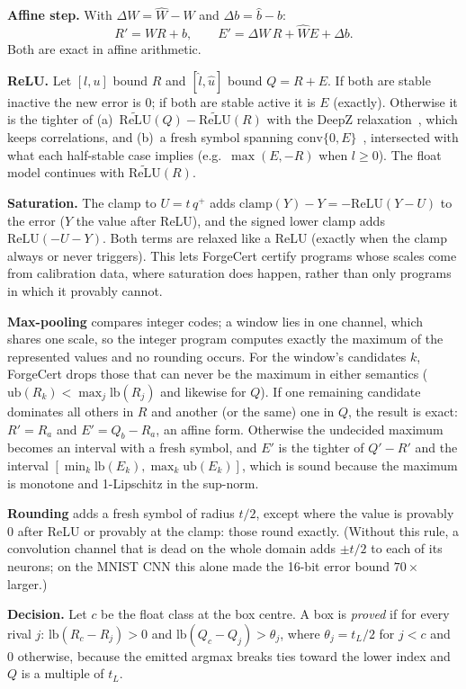 \textbf{Affine step.} With $\Delta W=\hat W-W$ and $\Delta b=\hat b-b$:
\[R'=W R+b,\qquad E'=\Delta W\,R+\hat W E+\Delta b .\]
Both are exact in affine arithmetic.

\textbf{ReLU.} Let $[l,u]$ bound $R$ and $[\hat l,\hat u]$ bound $Q=R+E$. If both are stable inactive the new error is $0$; if both are stable active it is $E$ (exactly). Otherwise it is the tighter of (a)~$\widetilde{\mathrm{ReLU}}(Q)-\widetilde{\mathrm{ReLU}}(R)$ with the DeepZ relaxation~\cite{deepz}, which keeps correlations, and (b)~a fresh symbol spanning $\mathrm{conv}\{0,E\}$~\cite{reludiff}, intersected with what each half-stable case implies (e.g.\ $\max(E,-R)$ when $l\ge0$). The float model continues with $\widetilde{\mathrm{ReLU}}(R)$.

\textbf{Saturation.} The clamp to $U=t\,q^+$ adds $\mathrm{clamp}(Y)-Y=-\mathrm{ReLU}(Y-U)$ to the error ($Y$ the value after ReLU), and the signed lower clamp adds $\mathrm{ReLU}(-U-Y)$. Both terms are relaxed like a ReLU (exactly when the clamp always or never triggers). This lets ForgeCert certify programs whose scales come from calibration data, where saturation does happen, rather than only programs in which it provably cannot.

\textbf{Max-pooling} compares integer codes; a window lies in one channel, which shares one scale, so the integer program computes exactly the maximum of the represented values and no rounding occurs. For the window's candidates $k$, ForgeCert drops those that can never be the maximum in either semantics ($\mathrm{ub}(R_k)<\max_j\mathrm{lb}(R_j)$ and likewise for $Q$). If one remaining candidate dominates all others in $R$ and another (or the same) one in $Q$, the result is exact: $R'=R_a$ and $E'=Q_b-R_a$, an affine form. Otherwise the undecided maximum becomes an interval with a fresh symbol, and $E'$ is the tighter of $Q'-R'$ and the interval $[\min_k\mathrm{lb}(E_k),\max_k\mathrm{ub}(E_k)]$, which is sound because the maximum is monotone and 1-Lipschitz in the sup-norm.

\textbf{Rounding} adds a fresh symbol of radius $t/2$, except where the value is provably $0$ after ReLU or provably at the clamp: those round exactly. (Without this rule, a convolution channel that is dead on the whole domain adds $\pm t/2$ to each of its neurons; on the MNIST CNN this alone made the 16-bit error bound $70\times$ larger.)

\textbf{Decision.} Let $c$ be the float class at the box centre. A box is \emph{proved} if for every rival $j$: $\mathrm{lb}(R_c-R_j)>0$ and $\mathrm{lb}(Q_c-Q_j)>\theta_j$, where $\theta_j=t_L/2$ for $j<c$ and $0$ otherwise, because the emitted argmax breaks ties toward the lower index and $Q$ is a multiple of $t_L$.

